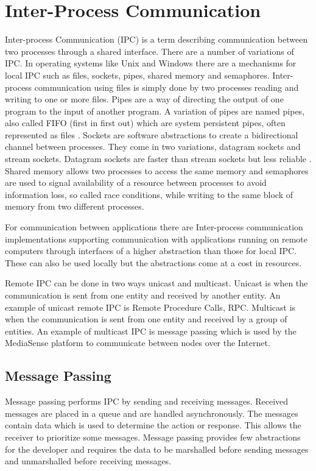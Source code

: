 \section{Inter-Process Communication}
Inter-process Communication (IPC) is a term describing communication between two processes through a shared interface. There are a number of variations of IPC. In operating systems like Unix and Windows there are a mechanisms for local IPC such as files, sockets, pipes, shared memory and semaphores. 
Inter-process communication using files is simply done by two processes reading and writing to one or more files. Pipes are a way of directing the output of one program to the input of another program. A variation of pipes are named pipes, also called FIFO (first in first out) which are system persistent pipes, often represented as files \cite{Lewandowski97interprocesscommunication}. Sockets are software abstractions to create a bidirectional channel between processes. They come in two variations, datagram sockets and stream sockets. Datagram sockets are faster than stream sockets but less reliable \cite{Lewandowski97interprocesscommunication}. Shared memory allows two processes to access the same memory and semaphores are used to signal availability of a resource between processes to avoid information loss, so called race conditions, while writing to the same block of memory from two different processes.

For communication between applications there are Inter-process communication implementations supporting communication with applications running on remote computers through interfaces of a higher abstraction than those for local IPC. These can also be used locally but the abstractions come at a cost in resources.

Remote IPC can be done in two ways unicast and multicast. Unicast is when the communication is sent from one entity and received by another entity. An example of unicast remote IPC is Remote Procedure Calls, RPC. Multicast is when the communication is sent from one entity and received by a group of entities. An example of multicast IPC is message passing which is used by the MediaSense platform to communicate between nodes over the Internet.

\subsection{Message Passing}
Message passing performs IPC by sending and receiving messages. Received messages are placed in a queue and are handled asynchronously.
The messages contain data which is used to determine the action or response. This allows the receiver to prioritize some messages. Message passing provides few abstractions for the developer and requires the data to be marshalled before sending messages and unmarshalled before receiving messages. 

